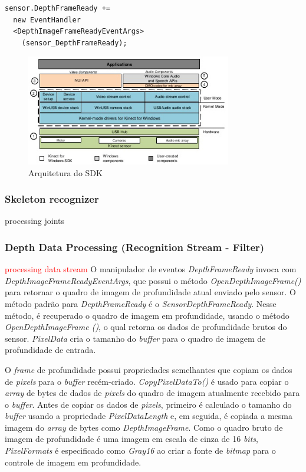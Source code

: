 \begin{verbatim}
sensor.DepthFrameReady +=
  new EventHandler
  <DepthImageFrameReadyEventArgs>
    (sensor_DepthFrameReady);
\end{verbatim}


\begin{figure}[ht]
\centering
\includegraphics[width=0.8\textwidth]{images/sdk_architecture_color.png}
\caption{Arquitetura do SDK}
\label{fig:sdk_architecture_color}
\end{figure}

\subsubsection{Skeleton recognizer }\label{sec:skeleton}
processing joints

\subsubsection{Depth Data Processing (Recognition Stream - Filter)}\label{sec:depthDataProcessing}
\textcolor{red}{processing data stream}
O manipulador de eventos \textit{DepthFrameReady} invoca com \textit{DepthImageFrameReadyEventArgs}, que possui o método \textit{OpenDepthImageFrame()} para retornar o quadro de imagem de profundidade atual enviado pelo sensor. O  método padrão para \textit{DepthFrameReady} é o \textit{SensorDepthFrameReady}. Nesse método, é recuperado o quadro de imagem em profundidade, usando o método \textit{OpenDepthImageFrame ()}, o qual retorna os dados de profundidade brutos do sensor. \textit{PixelData} cria o tamanho do \textit{buffer} para o quadro de imagem de profundidade de entrada.

O \textit{frame} de profundidade possui propriedades semelhantes que copiam os dados de \textit{pixels} para o \textit{buffer} recém-criado. \textit{CopyPixelDataTo()} é usado para copiar o \textit{array} de bytes de dados de \textit{pixels} do quadro de imagem atualmente recebido para o \textit{buffer}. Antes de copiar os dados de \textit{pixels}, primeiro é calculado o tamanho do \textit{buffer} usando a propriedade \textit{PixelDataLength} e, em seguida, é copiada a mesma imagem do \textit{array} de bytes como \textit{DepthImageFrame}. Como o quadro bruto de imagem de profundidade é uma imagem em escala de cinza de 16 \textit{bits}, \textit{PixelFormats} é especificado  como \textit{Gray16} ao criar a fonte de \textit{bitmap} para o controle de imagem em profundidade.

